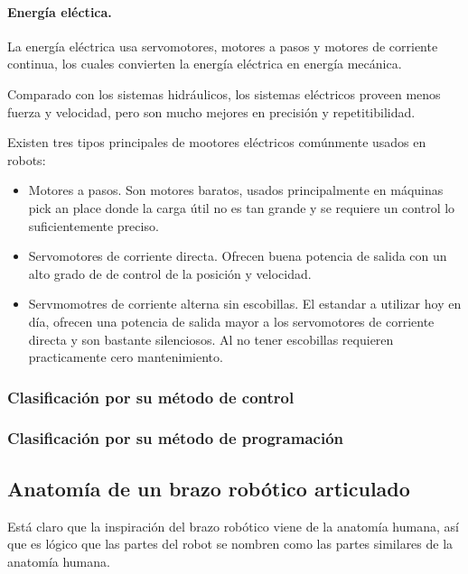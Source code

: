 \paragraph{Energía eléctica.} La energía eléctrica usa servomotores, motores a pasos y motores de corriente continua, los cuales convierten la energía eléctrica en energía mecánica.

Comparado con los sistemas hidráulicos, los sistemas eléctricos proveen menos fuerza y velocidad, pero son mucho mejores en precisión y repetitibilidad.

Existen tres tipos principales de mootores eléctricos comúnmente usados en robots:

\begin{itemize}
\itemsep0em
\item Motores a pasos. Son motores baratos, usados principalmente en máquinas pick an place donde la carga útil no es tan grande y se requiere un control lo suficientemente preciso.

\item Servomotores de corriente directa. Ofrecen buena potencia de salida con un alto grado de de control de la posición y velocidad. 

\item Servmomotres de corriente alterna sin escobillas. El estandar a utilizar hoy en día, ofrecen una potencia de salida mayor a los servomotores de corriente directa y son bastante silenciosos. Al no tener escobillas requieren practicamente cero mantenimiento.
\end{itemize}



\subsubsection{Clasificación por su método de control}
\subsubsection{Clasificación por su método de programación}



\subsection{Anatomía de un brazo robótico articulado}

Está claro que la inspiración del brazo robótico viene de la anatomía humana, así que es lógico que las partes del robot se nombren como las partes similares de la anatomía humana.

